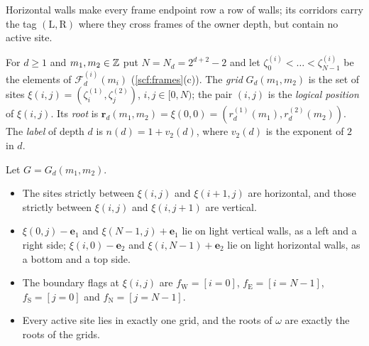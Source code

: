 Horizontal walls make every frame endpoint row a row of walls; its corridors carry the tag $(\mathrm L,\mathrm R)$ where they cross frames of the owner depth, but contain no active site.

\begin{definition}[Grids]\label{bg:def-grid}
For $d\ge1$ and $m_1,m_2\in\mathbb{Z}$ put $N=N_d=2^{d+2}-2$ and let $\zeta^{(i)}_0<\dots<\zeta^{(i)}_{N-1}$ be the elements of $\mathcal F^{(i)}_d(m_i)$ (\cref{scf:frames}(c)). The \emph{grid} $G_d(m_1,m_2)$ is the set of sites $\xi(i,j)=(\zeta^{(1)}_i,\zeta^{(2)}_j)$, $i,j\in[0,N)$; the pair $(i,j)$ is the \emph{logical position} of $\xi(i,j)$. Its \emph{root} is $\mathbf r_d(m_1,m_2)=\xi(0,0)=(r^{(1)}_d(m_1),r^{(2)}_d(m_2))$. The \emph{label} of depth $d$ is $n(d)=1+v_2(d)$, where $v_2(d)$ is the exponent of $2$ in $d$.
\end{definition}

\begin{lemma}[Grids]\label{bg:grids}
Let $G=G_d(m_1,m_2)$.
\begin{itemize}
\item[(a)] The sites strictly between $\xi(i,j)$ and $\xi(i+1,j)$ are horizontal, and those strictly between $\xi(i,j)$ and $\xi(i,j+1)$ are vertical.
\item[(b)] $\xi(0,j)-\mathbf e_1$ and $\xi(N-1,j)+\mathbf e_1$ lie on light vertical walls, as a left and a right side; $\xi(i,0)-\mathbf e_2$ and $\xi(i,N-1)+\mathbf e_2$ lie on light horizontal walls, as a bottom and a top side.
\item[(c)] The boundary flags at $\xi(i,j)$ are $f_{\mathrm W}=[i=0]$, $f_{\mathrm E}=[i=N-1]$, $f_{\mathrm S}=[j=0]$ and $f_{\mathrm N}=[j=N-1]$.
\item[(d)] Every active site lies in exactly one grid, and the roots of $\omega$ are exactly the roots of the grids.
\end{itemize}
\end{lemma}

